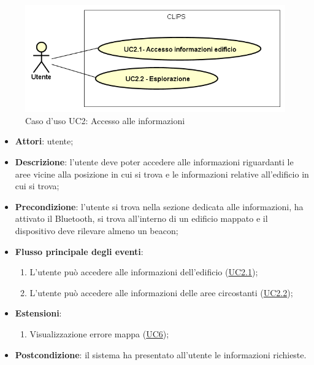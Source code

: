 \documentclass[../AnalisiDeiRequisiti.tex]{subfiles}
\begin{document}
        \begin{figure}[!h]
            \centering
            \includegraphics[scale=0.95, width=\textwidth]{img/UC2.png}
            \caption{Caso d'uso UC2: Accesso alle informazioni}\label{fig:UC2} 
        \end{figure}
\begin{itemize}
\item \textbf{Attori}: utente;
\item \textbf{Descrizione}: l'utente deve poter accedere alle informazioni riguardanti le aree vicine alla posizione in cui si trova e le informazioni relative all'edificio in cui si trova; 
      \item \textbf{Precondizione}: l'utente si trova nella sezione dedicata alle informazioni, ha attivato il Bluetooth, si trova all'interno di un edificio mappato e il dispositivo deve rilevare almeno un beacon;

        \item \textbf{Flusso principale degli eventi}:
          \begin{enumerate}
          \item L'utente può accedere alle informazioni dell'edificio (\hyperlink{UC2.1}{UC2.1});
          \item L'utente può accedere alle informazioni delle aree circostanti (\hyperlink{UC2.2}{UC2.2});

      \end{enumerate}
    \item \textbf{Estensioni}:
      \begin{enumerate}
          \item Visualizzazione errore mappa (\hyperlink{UC6}{UC6});

      \end{enumerate}
    \item \textbf{Postcondizione}: il sistema ha presentato all'utente le informazioni richieste.
  \end{itemize}
\hypertarget{UC2.1}{}
\end{document}
